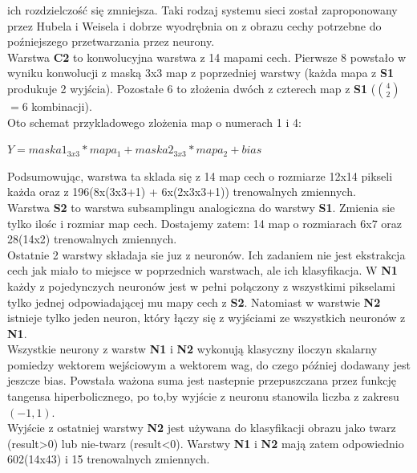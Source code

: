 \documentclass[11pt,a4paper]{article}
\begin{document}
ich rozdzielczość się zmniejsza. Taki rodzaj systemu sieci został zaproponowany przez Hubela i Weisela i dobrze 
wyodrębnia on z obrazu cechy potrzebne do poźniejszego przetwarzania przez neurony.\\
\indent
Warstwa  \textbf{C2} to konwolucyjna warstwa z 14 mapami cech. Pierwsze 8 powstało w wyniku konwolucji 
z maską 3x3 map z poprzedniej warstwy (każda mapa z  \textbf{S1} produkuje 2 wyjścia).
Pozostałe 6 to złożenia dwóch z czterech map z  \textbf{S1} ($4\choose 2$ $=6$ kombinacji).\\
Oto schemat przykladowego zlożenia map o numerach 1 i 4:\\
\begin{center}
$Y = maska1_{3x3}*mapa_{1}+maska2_{3x3}*mapa_{2}+bias$
\end{center}
Podsumowując, warstwa ta sklada się z 14 map cech o rozmiarze 12x14 pikseli każda oraz z 196(8x(3x3+1)
+ 6x(2x3x3+1)) trenowalnych zmiennych.\\
\indent
Warstwa  \textbf{S2} to warstwa subsamplingu analogiczna do warstwy  \textbf{S1}. 
Zmienia sie tylko ilośc i rozmiar map cech. 
Dostajemy zatem: 14 map o rozmiarach 6x7 oraz 28(14x2) trenowalnych zmiennych.\\
\indent
Ostatnie 2 warstwy składaja sie juz z neuronów. Ich zadaniem nie jest ekstrakcja cech jak miało to miejsce 
w poprzednich warstwach, ale ich klasyfikacja. W  \textbf{N1} każdy z pojedynczych neuronów jest w pełni
połączony z wszystkimi pikselami tylko jednej odpowiadającej mu mapy cech z  \textbf{S2}.
Natomiast w warstwie  \textbf{N2} istnieje tylko jeden neuron, który łączy się z wyjściami ze wszystkich neuronów 
z  \textbf{N1}. \\
\indent
Wszystkie neurony z warstw  \textbf{N1} i  \textbf{N2} wykonują klasyczny iloczyn skalarny pomiedzy wektorem 
wejściowym a wektorem wag, do czego później dodawany jest jeszcze bias. Powstała ważona suma jest nastepnie 
przepuszczana przez funkcję tangensa hiperbolicznego, po to,by wyjście z neuronu stanowila liczba z zakresu $(-1,1).$\\
Wyjście z ostatniej warstwy  \textbf{N2} jest używana do klasyfikacji obrazu jako twarz (result>0) lub nie-twarz (result<0).
Warstwy  \textbf{N1} i  \textbf{N2} mają zatem odpowiednio 602(14x43) i 15 trenowalnych zmiennych.\\
\end{document}
